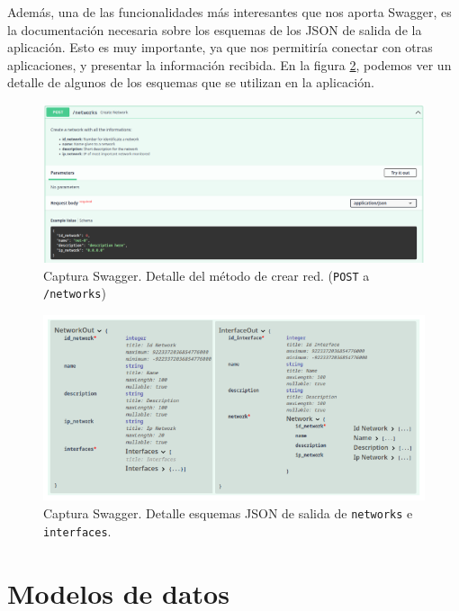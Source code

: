 \documentclass[a4paper, oneside, 12pt]{book}
\begin{document}
	\noindent Además, una de las funcionalidades más interesantes que nos aporta Swagger, es la documentación necesaria sobre los esquemas de los JSON de salida de la aplicación. Esto es muy importante, ya que nos permitiría conectar con otras aplicaciones, y presentar la información recibida. En la figura \ref{img: swagger schemas 1}, podemos ver un detalle de algunos de los esquemas que se utilizan en la aplicación.
	
	\pagebreak
	
	\begin{figure}[h!]
		\includegraphics[width=1.2\textwidth, center]{img/swagger_2.png}
		\caption{Captura Swagger. Detalle del método de crear red. (\texttt{POST} a \texttt{/networks})}
		\label{img: swagger 2}
	\end{figure}

	\begin{figure}[h!]
		\includegraphics[width=1.2\textwidth, center]{img/swagger_schemas_1.png}
		\caption{Captura Swagger. Detalle esquemas JSON de salida de \texttt{networks} e \texttt{interfaces}.}
		\label{img: swagger schemas 1}
	\end{figure}
	
	
	\pagebreak
	
	\section{Modelos de datos}
	
\end{document}
